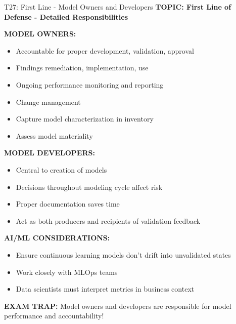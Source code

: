 \documentclass[8pt]{beamer}
\begin{document}
	\begin{frame}{T27: First Line - Model Owners and Developers}
		\fontsize{6.5}{7.5}\selectfont
		\textbf{TOPIC: First Line of Defense - Detailed Responsibilities}
		
		\vspace{0.1cm}
		\textbf{MODEL OWNERS:}
		\begin{itemize}
			\item Accountable for proper development, validation, approval
			\item Findings remediation, implementation, use
			\item Ongoing performance monitoring and reporting
			\item Change management
			\item Capture model characterization in inventory
			\item Assess model materiality
		\end{itemize}
		
		\vspace{0.1cm}
		\textbf{MODEL DEVELOPERS:}
		\begin{itemize}
			\item Central to creation of models
			\item Decisions throughout modeling cycle affect risk
			\item Proper documentation saves time
			\item Act as both producers and recipients of validation feedback
		\end{itemize}
		
		\vspace{0.1cm}
		\textbf{AI/ML CONSIDERATIONS:}
		\begin{itemize}
			\item Ensure continuous learning models don't drift into unvalidated states
			\item Work closely with MLOps teams
			\item Data scientists must interpret metrics in business context
		\end{itemize}
		
		\textcolor{myred}{\textbf{EXAM TRAP:}} Model owners and developers are \textcolor{myblue}{responsible for model performance and accountability}!
	\end{frame}
	
\end{document}
